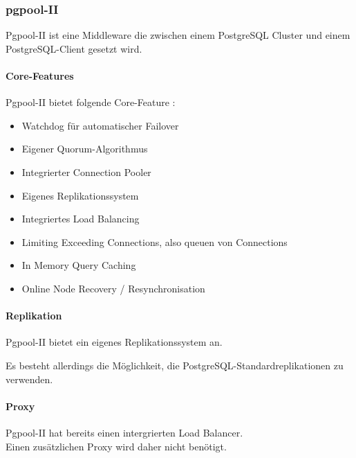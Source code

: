 
\clearpage
\subsubsection{pgpool-II}
\begin{flushleft}
    Pgpool-II ist eine Middleware die zwischen einem \Gls{PostgreSQL Cluster} und einem PostgreSQL-Client gesetzt wird.
\end{flushleft}
\begin{flushleft}
    \paragraph{Core-Features}
    Pgpool-II bietet folgende Core-Feature \cite{3XWCD3KX}:
    \begin{itemize}
        \item Watchdog für automatischer Failover
        \item Eigener \Gls{Quorum}-Algorithmus
        \item Integrierter \Gls{Connection Pooler}
        \item Eigenes Replikationssystem
        \item Integriertes Load Balancing
        \item Limiting Exceeding Connections, also queuen von Connections
        \item In Memory Query Caching
        \item Online Node Recovery / Resynchronisation
    \end{itemize}
\end{flushleft}
\begin{flushleft}
    \paragraph{Replikation}
    Pgpool-II bietet ein eigenes Replikationssystem an.
\end{flushleft}
\begin{flushleft}
    Es besteht allerdings die Möglichkeit, die PostgreSQL-Standardreplikationen zu verwenden.
\end{flushleft}
\begin{flushleft}
    \paragraph{Proxy}
    Pgpool-II hat bereits einen intergrierten Load Balancer.\\
    Einen zusätzlichen Proxy wird daher nicht benötigt.
\end{flushleft}
